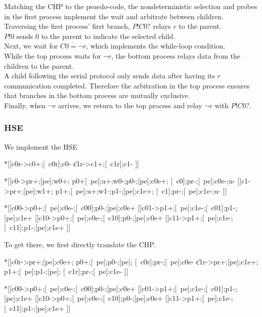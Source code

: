 \documentclass{article}
\begin{document}
\noindent
Matching the CHP to the psuedo-code, the nondeterministic selection and 
probes in the first process implement the wait and arbitrate between children. \\
Traversing the first process' first branch, $P!C0?$ relays $r$ to the parent. \\
$P!0$ sends $0$ to the parent to indicate the selected child. \\
Next, we wait for $\overline{C0=\neg r}$, which implements the while-loop 
condition. \\
While the top process waits for $\neg r$, the bottom process relays 
data from the children to the parent. \\
A child following the serial protocol only sends data after having 
its $r$ communication completed. Therefore the arbitration in
the top process ensures that branches in the bottom process are mutually 
exclusive. \\
Finally, when $\neg r$ arrives, we return to the top process and relay
$\neg r$ with $P!C0?$. \\


\subsubsection*{HSE}

We implement the HSE

\begin{hse}
*[[c0r->c0+;[~c0r];c0-
  \|c1r->c1+;[~c1r];c1-
 ]]

*[[c0->pr+;[pe];w0+;
    p0+[~pe];u+;w0-;p0-;[pe];c0e+;
    [~c0];pr-;[~pe];c0e-;u-
  []c1->pr+;[pe];w1+;
    p1+;[~pe];u+;w1-;p1-;[pe];c1e+;
    [~c1];pr-;[~pe];c1e-;u-
 ]]
\end{hse}

\begin{hse}
*[[c00->p0+;[~pe];c0e-;[~c00];p0-;[pe];c0e+
  []c01->p1+;[~pe];c1e-;[~c01];p1-;[pe];c1e+
  []c10->p0+;[~pe];c0e-;[~c10];p0-;[pe];c0e+
  []c11->p1+;[~pe];c1e-;[~c11];p1-;[pe];c1e+
 ]]
\end{hse}

\noindent
To get there, we first directly translate the CHP.

\begin{hse}
*[[c0r->pr+;[pe];c0e+;
    p0+;[~pe];p0-;[pe];
    [~c0r];pr-;[~pe];c0e-
  \|c1r->pr+;[pe];c1e+;
    p1+;[~pe];p1-;[pe];
    [~c1r];pr-;[~pe];c1e-
 ]]
\end{hse}

\begin{hse}
*[[c00->p0+;[~pe];c0e-;[~c00];p0-;[pe];c0e+
  []c01->p1+;[~pe];c1e-;[~c01];p1-;[pe];c1e+
  []c10->p0+;[~pe];c0e-;[~c10];p0-;[pe];c0e+
  []c11->p1+;[~pe];c1e-;[~c11];p1-;[pe];c1e+
 ]]
\end{hse}
\end{document}
